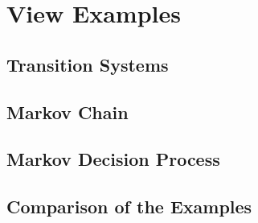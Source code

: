 \documentclass[preview]{standalone}
\begin{document}
\section{View Examples}
\subsection{Transition Systems}
\subsection{Markov Chain}
\subsection{Markov Decision Process}
\subsection{Comparison of the Examples}
\end{document}
